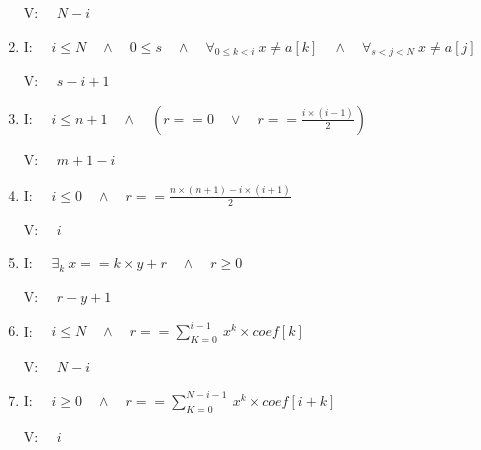 \documentclass{article}
\begin{document}
\begin{enumerate}[label=\alph*)]
    V: $ \quad N - i $
    
    \item I: $ \quad i \leq N \quad \land \quad 0 \leq s \quad \land \quad \forall_{0 \leq k < i} \  x \neq a[k] \quad \land \quad \forall_{s < j < N} \  x \neq a[j] $
    
    V: $ \quad s - i + 1 $
    
    \item I: $ \quad i \leq n + 1 \quad \land \quad (r == 0 \quad \lor \quad r == \frac{i \times (i-1)}{2}) $
    
    V: $ \quad m + 1 - i $
    
    \item I: $ \quad i \leq 0 \quad \land \quad r == \frac{n \times (n+1) - i \times (i+1)}{2} $
    
    V: $ \quad i $
    
    \item I: $ \quad \exists_k \  x == k \times y + r \quad \land \quad r \geq 0 $
    
    V: $ \quad r - y + 1 $
    
    \item I: $ \quad i \leq N \quad \land \quad r == \sum_{K=0}^{i-1} \  x^k \times coef[k] $
    
    V: $ \quad N - i $
    
    \item I: $ \quad i \geq 0 \quad \land \quad r == \sum_{K=0}^{N-i-1} \  x^k \times coef[i+k] $
    
    V: $ \quad i $
\end{enumerate}
\end{document}
